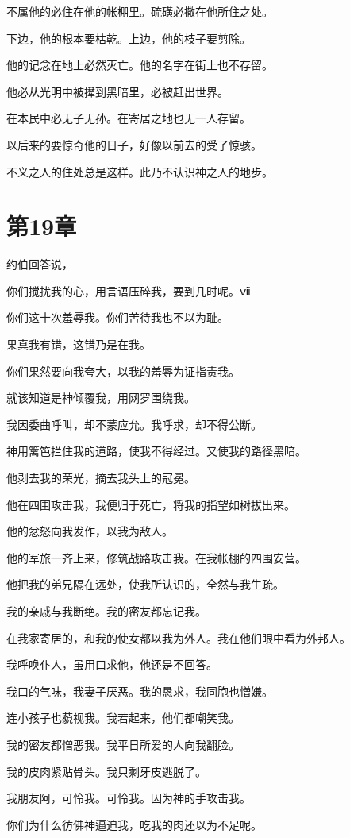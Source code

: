 \documentclass[12pt,oneside]{book}
\begin{document}
不属他的必住在他的帐棚里。硫磺必撒在他所住之处。

下边，他的根本要枯乾。上边，他的枝子要剪除。

他的记念在地上必然灭亡。他的名字在街上也不存留。

他必从光明中被撵到黑暗里，必被赶出世界。

在本民中必无子无孙。在寄居之地也无一人存留。

以后来的要惊奇他的日子，好像以前去的受了惊骇。

不义之人的住处总是这样。此乃不认识神之人的地步。


\chapter{第19章}
约伯回答说，

你们搅扰我的心，用言语压碎我，要到几时呢。ⅶ

你们这十次羞辱我。你们苦待我也不以为耻。

果真我有错，这错乃是在我。

你们果然要向我夸大，以我的羞辱为证指责我。

就该知道是神倾覆我，用网罗围绕我。

我因委曲呼叫，却不蒙应允。我呼求，却不得公断。

神用篱笆拦住我的道路，使我不得经过。又使我的路径黑暗。

他剥去我的荣光，摘去我头上的冠冕。

他在四围攻击我，我便归于死亡，将我的指望如树拔出来。

他的忿怒向我发作，以我为敌人。

他的军旅一齐上来，修筑战路攻击我。在我帐棚的四围安营。

他把我的弟兄隔在远处，使我所认识的，全然与我生疏。

我的亲戚与我断绝。我的密友都忘记我。

在我家寄居的，和我的使女都以我为外人。我在他们眼中看为外邦人。

我呼唤仆人，虽用口求他，他还是不回答。

我口的气味，我妻子厌恶。我的恳求，我同胞也憎嫌。

连小孩子也藐视我。我若起来，他们都嘲笑我。

我的密友都憎恶我。我平日所爱的人向我翻脸。

我的皮肉紧贴骨头。我只剩牙皮逃脱了。

我朋友阿，可怜我。可怜我。因为神的手攻击我。

你们为什么彷佛神逼迫我，吃我的肉还以为不足呢。
\end{document}
